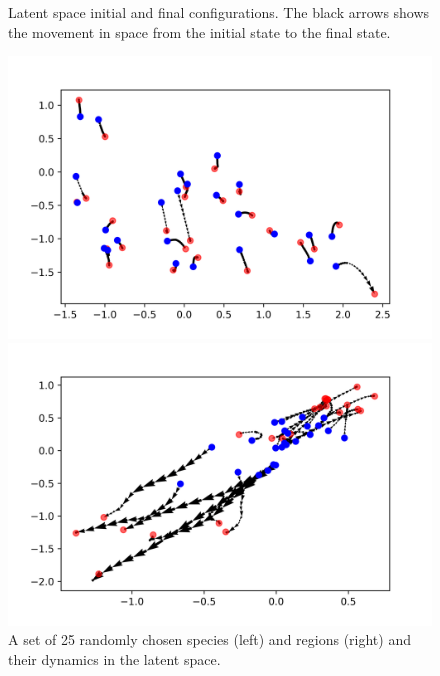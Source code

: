 \documentclass[mscthesis]{usiinfthesis}
\begin{document}
\begin{figure}[H]
\begin{minipage}[b]{0.5\linewidth}
    \vspace{4ex}
  \end{minipage}  
\caption{Latent space initial and final configurations. The black arrows shows the movement in space from the initial state to the final state.}
\label{fig:latentspace_config}
\end{figure}

\begin{figure}[H] 
  \label{ fig7} 
  \begin{minipage}[b]{0.5\linewidth}
    \centering
    \includegraphics[width=\linewidth]{latentspace_afew_species.png} 
    \vspace{4ex}
  \end{minipage}%
  \begin{minipage}[b]{0.5\linewidth}
    \centering
    \includegraphics[width=\linewidth]{latentspace_afew_region.png} 
    \vspace{4ex}
  \end{minipage}  
\caption{A set of 25 randomly chosen species (left) and regions (right) and their dynamics in the latent space.}
\label{fig:latentspace_afew}
\end{figure}
\end{document}
